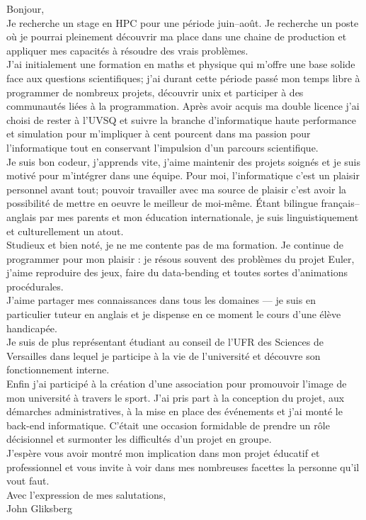 \documentclass[12pt,a4paper]{letter}
\begin{document}
Bonjour,
\\[.3in]
Je recherche un stage en HPC
pour une période juin\---août.
Je recherche un poste où je pourrai
pleinement découvrir ma place dans
une chaine de production et appliquer
mes capacités à résoudre des
vrais problèmes.
\\[.2in]
J'ai initialement une formation en
maths et physique qui m'offre une
base solide face aux questions
scientifiques;
j'ai durant cette période passé mon
temps libre à programmer de nombreux
projets, découvrir unix et participer à des
communautés liées à la programmation.
Après avoir acquis ma double licence
j'ai choisi de rester à l'UVSQ et suivre la
branche d'informatique haute performance
et simulation pour m'impliquer à cent
pourcent dans ma passion pour
l'informatique tout en conservant
l'impulsion d'un parcours scientifique.
\\[.2in]
Je suis bon codeur, j'apprends vite, j'aime maintenir des projets soignés et je suis motivé pour m'intégrer dans une équipe. Pour moi, l'informatique c'est un plaisir personnel avant tout; pouvoir travailler avec ma source de plaisir c'est avoir la possibilité de mettre en oeuvre le meilleur de moi-même. Étant bilingue français\---anglais par mes parents et mon éducation internationale, je suis linguistiquement et culturellement un atout.
\\[.2in]
Studieux et bien noté, je ne me contente pas de ma formation. Je continue de programmer pour mon plaisir : je résous souvent des problèmes du projet Euler, j'aime reproduire des jeux, faire du data-bending et toutes sortes d'animations procédurales.
\\[.1in]
J'aime partager mes connaissances dans tous les domaines \---- je suis en particulier tuteur en anglais et je dispense en ce moment le cours d'une élève handicapée.
\\[.1in]
Je suis de plus représentant étudiant au conseil de l'UFR des Sciences de Versailles dans lequel je participe à la vie de l'université et découvre son fonctionnement interne.
\\[.1in]
Enfin j'ai participé à la création d'une association pour promouvoir l'image de mon université à travers le sport. J'ai pris part à la conception du projet, aux démarches administratives, à la mise en place des événements et j'ai monté le back-end informatique. C'était une occasion formidable de prendre un rôle décisionnel et surmonter les difficultés d'un projet en groupe.
\\[.2in]
J'espère vous avoir montré mon implication dans mon projet éducatif et professionnel et vous invite à voir dans mes nombreuses facettes la personne qu'il vout faut.
\\[.3in]
Avec l'expression de mes salutations,
\\[.2in]
John Gliksberg
\end{document}
